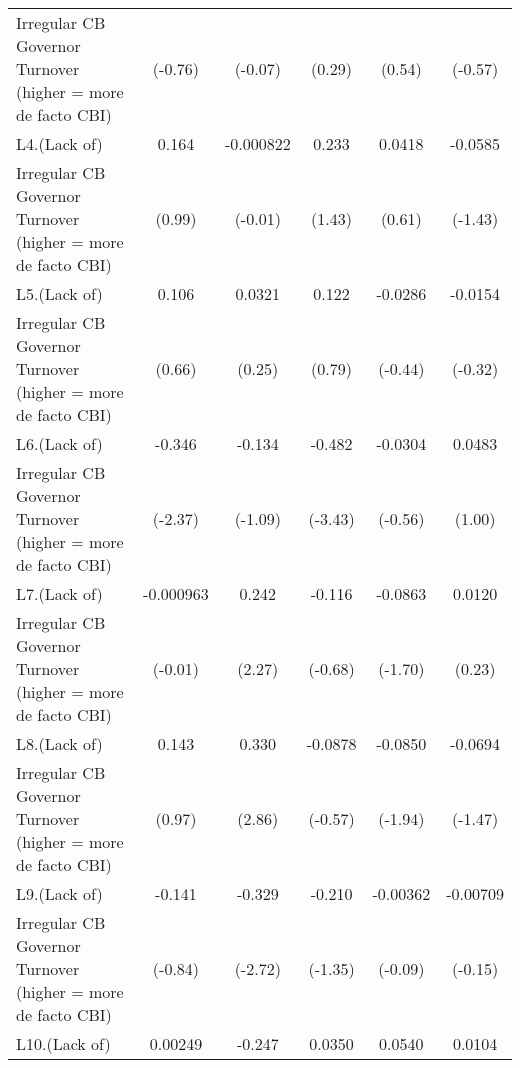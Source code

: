 {\begin{tabular}{l*{5}{c}}
Irregular CB Governor Turnover (higher = more de facto CBI)&     (-0.76)         &     (-0.07)         &      (0.29)         &      (0.54)         &     (-0.57)         \\
[1em]
L4.(Lack of)        &       0.164         &   -0.000822         &       0.233         &      0.0418         &     -0.0585         \\
Irregular CB Governor Turnover (higher = more de facto CBI)&      (0.99)         &     (-0.01)         &      (1.43)         &      (0.61)         &     (-1.43)         \\
[1em]
L5.(Lack of)        &       0.106         &      0.0321         &       0.122         &     -0.0286         &     -0.0154         \\
Irregular CB Governor Turnover (higher = more de facto CBI)&      (0.66)         &      (0.25)         &      (0.79)         &     (-0.44)         &     (-0.32)         \\
[1em]
L6.(Lack of)        &      -0.346\sym{*}  &      -0.134         &      -0.482\sym{***}&     -0.0304         &      0.0483         \\
Irregular CB Governor Turnover (higher = more de facto CBI)&     (-2.37)         &     (-1.09)         &     (-3.43)         &     (-0.56)         &      (1.00)         \\
[1em]
L7.(Lack of)        &   -0.000963         &       0.242\sym{*}  &      -0.116         &     -0.0863         &      0.0120         \\
Irregular CB Governor Turnover (higher = more de facto CBI)&     (-0.01)         &      (2.27)         &     (-0.68)         &     (-1.70)         &      (0.23)         \\
[1em]
L8.(Lack of)        &       0.143         &       0.330\sym{**} &     -0.0878         &     -0.0850         &     -0.0694         \\
Irregular CB Governor Turnover (higher = more de facto CBI)&      (0.97)         &      (2.86)         &     (-0.57)         &     (-1.94)         &     (-1.47)         \\
[1em]
L9.(Lack of)        &      -0.141         &      -0.329\sym{**} &      -0.210         &    -0.00362         &    -0.00709         \\
Irregular CB Governor Turnover (higher = more de facto CBI)&     (-0.84)         &     (-2.72)         &     (-1.35)         &     (-0.09)         &     (-0.15)         \\
[1em]
L10.(Lack of)       &     0.00249         &      -0.247\sym{*}  &      0.0350         &      0.0540         &      0.0104         \\

\end{tabular}}
